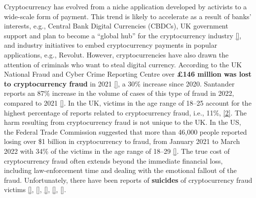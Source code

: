  Cryptocurrency has evolved from a niche application developed by activists to a wide-scale form of payment. This trend is likely to accelerate as a result of banks' interests, e.g., Central Bank Digital Currencies (CBDCs), UK government support and plan to become a ``global hub'' for the cryptocurrency industry \href{https://www.ft.com/content/24c9b6de-9cc6-4413-8b6a-e60653a29ce0?shareType=nongift}{[\printcntr]}, and industry initiatives to embed cryptocurrency payments in popular applications, e.g., Revolut. However, cryptocurrencies have also drawn the attention of criminals who want to steal digital currency. According to the UK National Fraud and Cyber Crime Reporting Centre over \textbf{£146 million was lost to cryptocurrency fraud} in 2021 \href{https://www.actionfraud.police.uk/news/cryptocurrency-fraud-leads-to-millions-in-losses-so-far-this-year} {[\printcntr]}, a 30\% increase since 2020. Santander reports an 87\% increase in the volume of cases of this type of fraud in 2022, compared to 2021 \href{https://www.santander.co.uk/about-santander/media-centre/press-releases/santander-warns-about-celebrity-endorsed-crypto-scams}{[\printcntr]}. In the UK, victims in the age range of 18–25 account for the highest percentage of reports related to cryptocurrency fraud, i.e., 11\%, \href{https://www.actionfraud.police.uk/news/cryptocurrency-fraud-leads-to-millions-in-losses-so-far-this-year} {[2]}. The harm resulting from cryptocurrency fraud is not unique to the UK. In the US, the Federal Trade Commission suggested that more than 46,000 people reported losing over \$1 billion in cryptocurrency to fraud, from January 2021 to March 2022 with 34\% of the victims in the age range of 18–29 \href{https://www.ftc.gov/news-events/data-visualizations/data-spotlight/2022/06/reports-show-scammers-cashing-crypto-craze}{[\printcntr]}. The true cost of cryptocurrency fraud often extends beyond the immediate financial loss, including law-enforcement time and dealing with the emotional fallout of the fraud. Unfortunately, there have been reports of \textbf{suicides} of cryptocurrency fraud victims 
 \href{https://www.vice.com/en/article/pkgda8/qanon-crypto-scam-whiplash347}{[\printcntr]},  \href{https://www.ozy.com/around-the-world/the-billion-dollar-crypto-currency-scams-youve-never-heard-about/266860/}{[\printcntr]},  \href{https://www.arabnews.com/node/1847671/middle-east}{[\printcntr]},  \href{https://english.sakshi.com/news/crime/suryapet-mans-suicide-over-cryptocurrency-fraud-could-be-tip-iceberg-147223}{[\printcntr]},  \href{https://www.reddit.com/r/CryptoCurrency/comments/r4asjl/someone_has_committed_suicide_after_losing_their/}{[\printcntr]}. 
 




